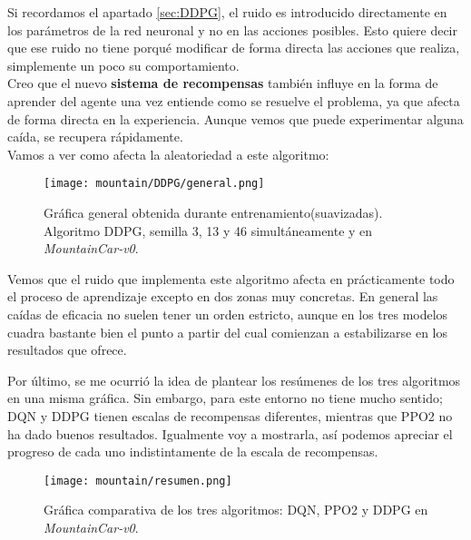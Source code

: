 \documentclass[11pt,fleqn]{book} %
\begin{document}
Si recordamos el apartado \ref{sec:DDPG}, el ruido es introducido directamente en los parámetros de la red neuronal y no en las acciones posibles. Esto quiere decir que ese ruido no tiene porqué modificar de forma directa las acciones que realiza, simplemente un poco su comportamiento. \\

Creo que el nuevo \textbf{sistema de recompensas} también influye en la forma de aprender del agente una vez entiende como se resuelve el problema, ya que afecta de forma directa en la experiencia. Aunque vemos que puede experimentar alguna caída, se recupera rápidamente. \\

Vamos a ver como afecta la aleatoriedad a este algoritmo: \\


\begin{figure}[H]
	\centering\texttt{[image: mountain/DDPG/general.png]}
	\caption{Gráfica general obtenida durante entrenamiento(suavizadas). Algoritmo DDPG, semilla 3, 13 y 46  simultáneamente y en \textit{MountainCar-v0}.}
	\label{fig:mountain19} %
\end{figure}

Vemos que el ruido que implementa este algoritmo afecta en prácticamente todo el proceso de aprendizaje excepto en dos zonas muy concretas. En general las caídas de eficacia no suelen tener un orden estricto, aunque en los tres modelos cuadra bastante bien el punto a partir del cual comienzan a estabilizarse en los resultados que ofrece.

Por último, se me ocurrió la idea de plantear los resúmenes de los tres algoritmos en una misma gráfica. Sin embargo, para este entorno no tiene mucho sentido; DQN y DDPG tienen escalas de recompensas diferentes, mientras que PPO2 no ha dado buenos resultados. Igualmente voy a mostrarla, así podemos apreciar el progreso de cada uno indistintamente de la escala de recompensas.

\begin{figure}[H]
	\centering\texttt{[image: mountain/resumen.png]}
	\caption{Gráfica comparativa de los tres algoritmos: DQN, PPO2 y DDPG en  \textit{MountainCar-v0}.}
	\label{fig:mountain20} %
\end{figure}
\end{document}
